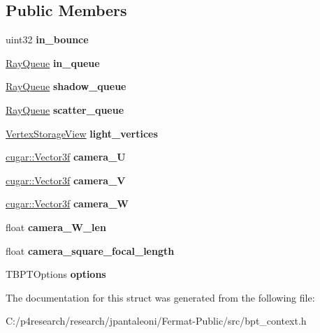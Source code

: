 \subsection*{Public Members}
\begin{DoxyCompactItemize}
\item 
\mbox{\label{struct_b_p_t_context_base_aa09a6dc8959a83d81486c9bd6280f8d6}} 
uint32 {\bfseries in\+\_\+bounce}
\item 
\mbox{\label{struct_b_p_t_context_base_ac6082ad7d9678a8e5e6173673ff92a3d}} 
\hyperlink{struct_ray_queue}{Ray\+Queue} {\bfseries in\+\_\+queue}
\item 
\mbox{\label{struct_b_p_t_context_base_aa57f6964ab4852b1ffba8cabedac4fd7}} 
\hyperlink{struct_ray_queue}{Ray\+Queue} {\bfseries shadow\+\_\+queue}
\item 
\mbox{\label{struct_b_p_t_context_base_aac6319a84f2a87b7f6813e9f36d6492e}} 
\hyperlink{struct_ray_queue}{Ray\+Queue} {\bfseries scatter\+\_\+queue}
\item 
\mbox{\label{struct_b_p_t_context_base_a04326acccfec76676b2d07f2ca9de7dc}} 
\hyperlink{struct_vertex_storage_view}{Vertex\+Storage\+View} {\bfseries light\+\_\+vertices}
\item 
\mbox{\label{struct_b_p_t_context_base_a15c5f6e58e807ff9c7153b714fd89cf7}} 
\hyperlink{structcugar_1_1_vector}{cugar\+::\+Vector3f} {\bfseries camera\+\_\+U}
\item 
\mbox{\label{struct_b_p_t_context_base_a00ad2326f04c69ba6f7f4560d868a6ac}} 
\hyperlink{structcugar_1_1_vector}{cugar\+::\+Vector3f} {\bfseries camera\+\_\+V}
\item 
\mbox{\label{struct_b_p_t_context_base_a0cb8ff154aad0ff71b7f277a159cc2b3}} 
\hyperlink{structcugar_1_1_vector}{cugar\+::\+Vector3f} {\bfseries camera\+\_\+W}
\item 
\mbox{\label{struct_b_p_t_context_base_a212f84e9da36ed87d8c7b08ae3f05d75}} 
float {\bfseries camera\+\_\+\+W\+\_\+len}
\item 
\mbox{\label{struct_b_p_t_context_base_ac2ad3ee44e3095e8f201b1d38cf22696}} 
float {\bfseries camera\+\_\+square\+\_\+focal\+\_\+length}
\item 
\mbox{\label{struct_b_p_t_context_base_adf209d0d6204b44ac0f57878dcb18a8a}} 
T\+B\+P\+T\+Options {\bfseries options}
\end{DoxyCompactItemize}


The documentation for this struct was generated from the following file\+:\begin{DoxyCompactItemize}
\item 
C\+:/p4research/research/jpantaleoni/\+Fermat-\/\+Public/src/bpt\+\_\+context.\+h\end{DoxyCompactItemize}
